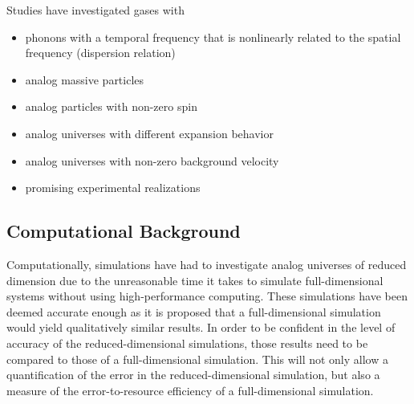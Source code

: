 \documentclass{article}
\begin{document}
            Studies have investigated gases with
            
            \begin{itemize}
                \item phonons with a temporal frequency that is nonlinearly related to the spatial frequency (dispersion relation)\cite{Nonlinear_dispersion_Lorentz_breaking_1, Nonlinear_dispersion_Lorentz_breaking_2, Nonlinear_dispersion_Lorentz_breaking_3}
                
                \item analog massive particles\cite{massive_1, massive_2, massive_3}

                \item analog particles with non-zero spin\cite{massive_and_spin_4, massive_and_spin_5, massive_and_spin_6, massive_and_spin_7}

                \item analog universes with different expansion behavior\cite{sudden_transition_1, sudden_transition_2, cyclic_cosmology, Experimental_interaction_strength_1}

                \item analog universes with non-zero background velocity\cite{background_velocity_1, background_velocity_2, background_velocity_3, background_velocity_4, background_velocity_5}

                \item promising experimental realizations \cite{Experimental_candidate_1, Experimental_candidate_2, Experimental_interaction_strength_1, Experimental_interaction_strength_2}
            \end{itemize}

        \subsection{Computational Background}

            Computationally, simulations have had to investigate analog universes of reduced dimension due to the unreasonable time it takes to simulate full-dimensional systems without using high-performance computing.  These simulations have been deemed accurate enough as it is proposed that a full-dimensional simulation would yield qualitatively similar results.  In order to be confident in the level of accuracy of the reduced-dimensional simulations, those results need to be compared to those of a full-dimensional simulation.  This will not only allow a quantification of the error in the reduced-dimensional simulation, but also a measure of the error-to-resource efficiency of a full-dimensional simulation.
    
\end{document}
